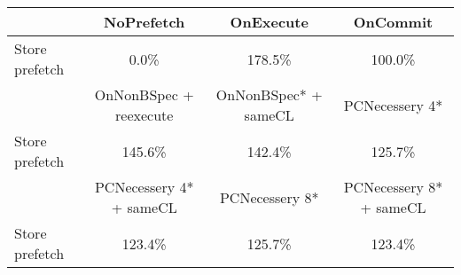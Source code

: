 \begin{tabular}{ l|ccc }
 & NoPrefetch & OnExecute & OnCommit\\ \hline
Store prefetch & 0.0\% & 178.5\% & 100.0\%\\ \hline
\hline
 & OnNonBSpec + reexecute & OnNonBSpec* + sameCL & PCNecessery 4*\\ \hline
Store prefetch & 145.6\% & 142.4\% & 125.7\%\\ \hline
\hline
 & PCNecessery 4* + sameCL & PCNecessery 8* & PCNecessery 8* + sameCL\\ \hline
Store prefetch & 123.4\% & 125.7\% & 123.4\%\\ \hline
\end{tabular}

